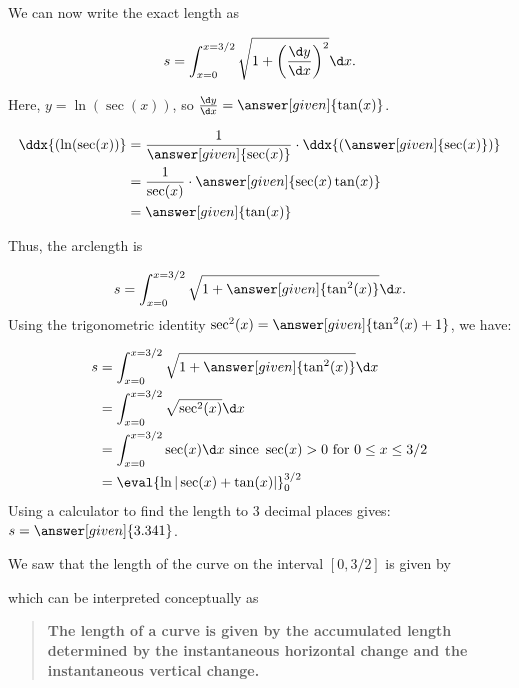 \documentclass{ximera}
\begin{document}
\begin{model}
\begin{explanation}
We can now write the exact length as

\[
s = \int_{x=0}^{x=3/2} \sqrt{1+\left( \frac{\d y}{\d x} \right)^2} \d x.
\]
 
 Here, $y= \ln( \sec(x) )$, so $ \frac{\d y}{\d x} = \answer[given]{\tan(x)}$.
 
 \begin{hint}
 \begin{align*}
 \ddx{( \ln( \sec(x) )} &= \frac{1}{\answer[given]{ \sec(x) }} \cdot \ddx{\left(\answer[given]{ \sec(x)}\right)}\\ 
 &= \frac{1}{ \sec(x) } \cdot \answer[given]{ \sec(x)\tan(x)}\\ 
 &= \answer[given]{\tan(x)}
 \end{align*}
 \end{hint}
 
 Thus, the arclength is
 
 \[
s = \int_{x=0}^{x=3/2} \sqrt{1+\answer[given]{\tan^2(x)}} \d x.
\]
Using the trigonometric identity $\sec^2(x) = \answer[given]{\tan^2(x)+1}$, we have:

\begin{align*}
s &= \int_{x=0}^{x=3/2} \sqrt{1+\answer[given]{\tan^2(x)}} \d x\\
&= \int_{x=0}^{x=3/2} \sqrt{\sec^2(x)} \d x \\
& = \int_{x=0}^{x=3/2} \sec(x) \d x \textrm{ since } \sec(x) > 0 \textrm{ for } 0\leq x\leq 3/2 \\
&= \eval{\ln|\sec(x) + \tan(x)|}_0^{3/2}  
\end{align*}
Using a calculator to find the length to 3 decimal places gives: $s = \answer[given]{3.341}$.
\end{explanation}
\end{model}



\begin{remark}
We saw that the length of the curve on the interval $[0,3/2]$ is given by
\begin{image}
\end{image}
which can be interpreted conceptually as 
\begin{quote}
  \textbf{The length of a curve is given by the
    \textcolor{green!70!black!70!blue}{accumulated}
    \textcolor{purple!50!blue!90!black}{length determined by the
      instantaneous horizontal change and the instantaneous vertical
      change}.}
\end{quote}
\end{remark}
\end{document}
